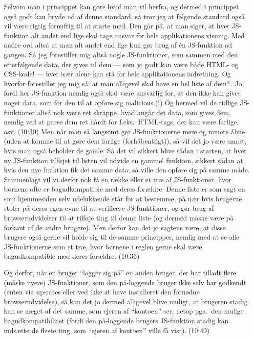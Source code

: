 \documentclass{report}
\begin{document}
Selvom man i princippet kan gøre hvad man vil herfra, og dermed i princippet også godt kan bryde ud af denne standard, så tror jeg at følgende standard også vil være rigtig fornuftig til at starte med. Den går på, at man siger, at hver JS-funktion alt andet end lige skal tage ansvar for hele applikationens visning. Med andre ord altså at man alt andet end lige kun gør brug af én JS-funktion ad gangen. Så jeg forestiller mig altså nogle JS-funktioner, som sammen med den efterfølgende data, der gives til dem --- som jo godt kan være både HTML- og CSS-kode! --- hver især alene kan stå for hele applikationens indretning. Og hvorfor forestiller jeg mig så, at man alligevel skal have en hel liste af dem?\,. Jo, fordi her JS-funktion nemlig også skal være ansvarlig for, at den ikke kan gives noget data, som for den til at opføre sig malicious.(!) Og hermed vil de tidlige JS-funktioner altså nok være ret skrappe, hvad angår det data, som gives dem, nemlig ved at parse dem ret hårdt for f.eks.\ HTML-tags, der kan være farlige, osv. (10:30) Men når man så langsomt gør JS-funktionerne mere og mmere åbne (uden at komme til at gøre dem farlige (forhåbentligt)), så vil det jo være smart, hvis man også beholder de gamle. Så det vil sikkert blive sådan i starten, at hver ny JS-funktion tilføjet til listen vil udvide en gammel funktion, sikkert sådan at hvis den nye funktion fik det samme data, så ville den opføre sig på samme måde. Sammenlagt vil vi derfor nok få en række eller et træ af JS-funktioner, hvor børnene ofte er bagudkompatible med deres forældre. Denne liste er som sagt en som hjemmesiden selv udelukkende står for at bestemme, på nær hvis brugerne stoler på deres egen evne til at verificere JS-funktioner, og gør brug af browserudvidelser til at tilføje ting til denne liste (og dermed måske være på forkant af de andre brugere). Men derfor kan det jo sagtens være, at disse brugere også gerne vil holde sig til de samme principper, nemlig med at se alle JS-funktionerne som et træ, hvor børnene i reglen gerne skal være bagudkompatible med deres forældre. (10:36)

Og derfor, når en bruger ``logger sig på'' en anden bruger, der har tilladt flere (måske nyere) JS-funktioner, som den på-loggende bruger ikke selv har godkendt (enten via up-rates eller ved ikke at have installeret den fornødne browserudvidelse), så kan det jo dermed alligevel blive muligt, at brugeren stadig kan se meget af det samme, som ejeren af ``kontoen'' ser, netop pga.\ den mulige bagudkompatibilitet (fordi den på-loggende brugers JS-funktion stadig kan indsætte de fleste ting, som ``ejeren af kontoen'' ville få vist). (10:40)
\end{document}
